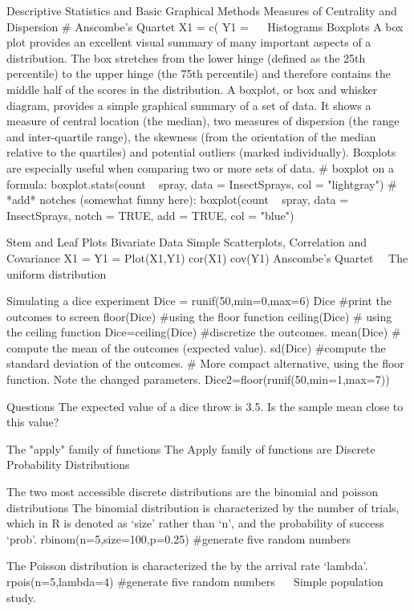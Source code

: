  
Descriptive Statistics and Basic Graphical Methods
Measures of Centrality and Dispersion
# Anscombe’s  Quartet
X1 = c(
Y1 =
 
Histograms
Boxplots
A box plot provides an excellent visual summary of many important aspects of a distribution. 
The box stretches from the lower hinge (defined as the 25th percentile) to the upper hinge (the 75th percentile) and therefore contains the middle half of the scores in the distribution.
A boxplot, or box and whisker diagram, provides a simple graphical summary of a set of data. It shows a measure of central location (the median), two measures of dispersion (the range and inter-quartile range), the skewness (from the orientation of the median relative to the quartiles) and potential outliers (marked individually). 
Boxplots are especially useful when comparing two or more sets of data. 
# boxplot on a formula:
boxplot.stats(count ~ spray, data = InsectSprays, col = "lightgray")
# *add* notches (somewhat funny here):
boxplot(count ~ spray, data = InsectSprays,        notch = TRUE, add = TRUE, col = "blue")

Stem and Leaf Plots
Bivariate Data 
Simple Scatterplots, Correlation and Covariance
X1 =
Y1 =
Plot(X1,Y1)
cor(X1)
cov(Y1)
Anscombe’s Quartet 
The uniform distribution

Simulating a dice experiment
Dice = runif(50,min=0,max=6)	
Dice				#print the outcomes to screen
floor(Dice)			#using the floor function
ceiling(Dice)			# using the ceiling function
Dice=ceiling(Dice)		#discretize the outcomes.
mean(Dice)			# compute the mean of the outcomes (expected value).
sd(Dice)			#compute the standard deviation of the outcomes.
# More compact alternative, using the floor function. Note the changed parameters.
Dice2=floor(runif(50,min=1,max=7))	

Questions
The expected value of a dice throw is 3.5. Is the sample mean close to this value?

The "apply" family of functions
 The Apply family of functions are 
Discrete Probability Distributions

The two most accessible discrete distributions are the binomial and poisson distributions
The binomial distribution is characterized by the number of trials, which in R is denoted as ‘size’ rather than ‘n’, and the probability of success ‘prob’.
rbinom(n=5,size=100,p=0.25)		#generate five random numbers

The Poisson distribution is characterized the by the arrival rate ‘lambda’.
rpois(n=5,lambda=4)			#generate five random numbers
 
Simple population study.

